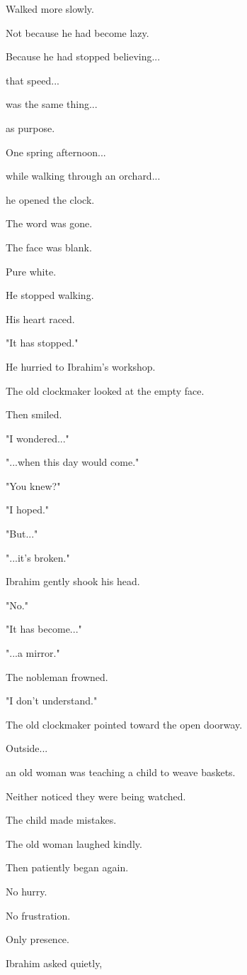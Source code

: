 \documentclass[12pt,openany]{book}
\begin{document}
Walked more slowly.

Not because he had become lazy.

Because he had stopped believing...

that speed...

was the same thing...

as purpose.

One spring afternoon...

while walking through an orchard...

he opened the clock.

The word was gone.

The face was blank.

Pure white.

He stopped walking.

His heart raced.

"It has stopped."

He hurried to Ibrahim's workshop.

The old clockmaker looked at the empty face.

Then smiled.

"I wondered..."

"...when this day would come."

"You knew?"

"I hoped."

"But..."

"...it's broken."

Ibrahim gently shook his head.

"No."

"It has become..."

"...a mirror."

The nobleman frowned.

"I don't understand."

The old clockmaker pointed toward the open doorway.

Outside...

an old woman was teaching a child to weave baskets.

Neither noticed they were being watched.

The child made mistakes.

The old woman laughed kindly.

Then patiently began again.

No hurry.

No frustration.

Only presence.

Ibrahim asked quietly,
\end{document}
